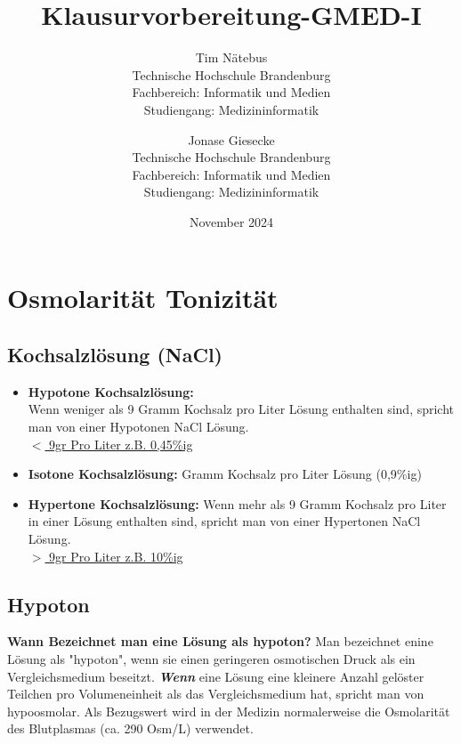 \documentclass{article}
\title{Klausurvorbereitung-GMED-I}
\author{
    Tim Nätebus \\
    Technische Hochschule Brandenburg \\
    Fachbereich: Informatik und Medien \\
    Studiengang: Medizininformatik \\
    \and
    Jonase Giesecke \\
    Technische Hochschule Brandenburg \\
    Fachbereich: Informatik und Medien \\
    Studiengang: Medizininformatik    
}
\date{November 2024}
\begin{document}
\maketitle

\newpage
%





\newpage
\section{Osmolarität \/ Tonizität}
\subsection{Kochsalzlösung (NaCl)}
\begin{itemize}
    \item \textbf{Hypotone Kochsalzlösung:} \\
    Wenn weniger als 9 Gramm Kochsalz pro Liter Lösung enthalten sind, spricht man von einer Hypotonen NaCl Lösung.
    \\ \underline{$<$ 9gr Pro Liter z.B. 0,45\%ig}
    \item \textbf{Isotone Kochsalzlösung:}  Gramm Kochsalz pro Liter Lösung (0,9\%ig)
    \item \textbf{Hypertone Kochsalzlösung:} \newline Wenn mehr als 9 Gramm Kochsalz pro Liter in einer Lösung enthalten sind, spricht man von einer Hypertonen NaCl Lösung.
    \\
    \underline{$>$ 9gr Pro Liter z.B. 10\%ig}
\end{itemize}

\subsection{Hypoton}
\textbf{Wann Bezeichnet man eine Lösung als hypoton?}
Man bezeichnet enine Lösung als "hypoton", wenn sie einen geringeren osmotischen Druck als ein Vergleichsmedium beseitzt. \newline 
\textbf{\textit{Wenn}} eine Lösung eine kleinere Anzahl gelöster Teilchen pro Volumeneinheit als das Vergleichsmedium hat, spricht man von hypoosmolar. \newline
Als Bezugswert wird in der Medizin normalerweise die Osmolarität des Blutplasmas (ca. 290 Osm/L) verwendet.
\end{document}
